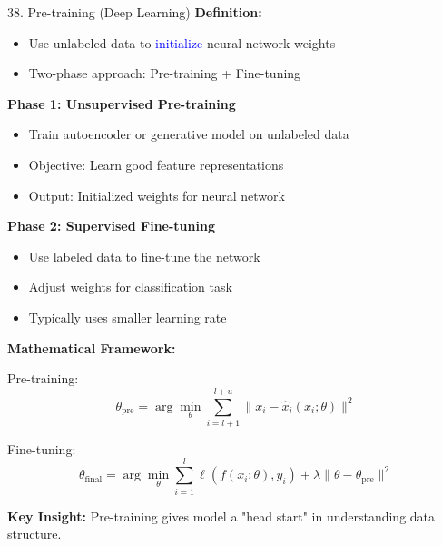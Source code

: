\documentclass[8pt]{beamer}
\begin{document}
	\begin{frame}{38. Pre-training (Deep Learning)}
		\fontsize{6.5}{7.5}\selectfont
		\textbf{Definition:}
		\begin{itemize}
			\item Use unlabeled data to \textcolor{blue}{initialize} neural network weights
			\item Two-phase approach: Pre-training + Fine-tuning
		\end{itemize}
		
		\textbf{Phase 1: Unsupervised Pre-training}
		\begin{itemize}
			\item Train autoencoder or generative model on unlabeled data
			\item Objective: Learn good feature representations
			\item Output: Initialized weights for neural network
		\end{itemize}
		
		\textbf{Phase 2: Supervised Fine-tuning}
		\begin{itemize}
			\item Use labeled data to fine-tune the network
			\item Adjust weights for classification task
			\item Typically uses smaller learning rate
		\end{itemize}
		
		\textbf{Mathematical Framework:}
		
		Pre-training:
		\[
		\theta_{\text{pre}} = \arg\min_\theta \sum_{i=l+1}^{l+u} \|x_i - \hat{x}_i(x_i; \theta)\|^2
		\]
		
		Fine-tuning:
		\[
		\theta_{\text{final}} = \arg\min_\theta \sum_{i=1}^l \ell(f(x_i; \theta), y_i) + \lambda \|\theta - \theta_{\text{pre}}\|^2
		\]
		
		\textbf{Key Insight:} Pre-training gives model a "head start" in understanding data structure.
	\end{frame}
	
\end{document}
